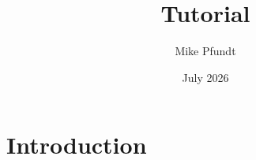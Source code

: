 \documentclass{article}
\title{Tutorial}
\author{Mike Pfundt}
\date{July 2026}
\begin{document}
\maketitle

\section{Introduction}
\end{document}
